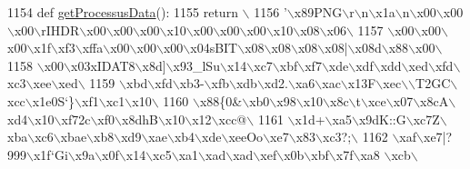 \begin{DoxyCode}
1154 \textcolor{keyword}{def }\hyperlink{namespaceimages_add9d06810f66b7f5621d259a3a02df09}{getProcessusData}():
1155     \textcolor{keywordflow}{return} \(\backslash\)
1156 \textcolor{stringliteral}{'\(\backslash\)x89PNG\(\backslash\)r\(\backslash\)n\(\backslash\)x1a\(\backslash\)n\(\backslash\)x00\(\backslash\)x00\(\backslash\)x00\(\backslash\)rIHDR\(\backslash\)x00\(\backslash\)x00\(\backslash\)x00\(\backslash\)x10\(\backslash\)x00\(\backslash\)x00\(\backslash\)x00\(\backslash\)x10\(\backslash\)x08\(\backslash\)x06\(\backslash\)}
1157 \textcolor{stringliteral}{\(\backslash\)x00\(\backslash\)x00\(\backslash\)x00\(\backslash\)x1f\(\backslash\)xf3\(\backslash\)xffa\(\backslash\)x00\(\backslash\)x00\(\backslash\)x00\(\backslash\)x04sBIT\(\backslash\)x08\(\backslash\)x08\(\backslash\)x08\(\backslash\)x08|\(\backslash\)x08d\(\backslash\)x88\(\backslash\)x00\(\backslash\)}
1158 \textcolor{stringliteral}{\(\backslash\)x00\(\backslash\)x03xIDAT8\(\backslash\)x8d]\(\backslash\)x93\_lSu\(\backslash\)x14\(\backslash\)xc7\(\backslash\)xbf\(\backslash\)xf7\(\backslash\)xde\(\backslash\)xdf\(\backslash\)xdd\(\backslash\)xed\(\backslash\)xfd\(\backslash\)xc3\(\backslash\)xee\(\backslash\)xed\(\backslash\)}
1159 \textcolor{stringliteral}{\(\backslash\)xbd\(\backslash\)xfd\(\backslash\)xb3-\(\backslash\)xfb\(\backslash\)xdb\(\backslash\)xd2.\(\backslash\)xa6\(\backslash\)xac\(\backslash\)x13F\(\backslash\)xec\(\backslash\)\(\backslash\)T2GC\(\backslash\)xcc\(\backslash\)x1e0S`\}\(\backslash\)xf1\(\backslash\)xc1\(\backslash\)x10\(\backslash\)}
1160 \textcolor{stringliteral}{\(\backslash\)x88\{0&\(\backslash\)xb0\(\backslash\)x98\(\backslash\)x10\(\backslash\)x8c\(\backslash\)t\(\backslash\)xce\(\backslash\)x07\(\backslash\)x8cA\(\backslash\)xd4\(\backslash\)x10\(\backslash\)xf72c\(\backslash\)xf0\(\backslash\)x8dhB\(\backslash\)x10\(\backslash\)x12\(\backslash\)xcc@\(\backslash\)}
1161 \textcolor{stringliteral}{\(\backslash\)x1d+\(\backslash\)xa5\(\backslash\)x9dK::G\(\backslash\)xc7Z\(\backslash\)xba\(\backslash\)xc6\(\backslash\)xbae\(\backslash\)xb8\(\backslash\)xd9\(\backslash\)xae\(\backslash\)xb4\(\backslash\)xde\(\backslash\)xeeOo\(\backslash\)xe7\(\backslash\)x83\(\backslash\)xc3?;\(\backslash\)}
1162 \textcolor{stringliteral}{\(\backslash\)xaf\(\backslash\)xe7|?999\(\backslash\)x1f`Gi\(\backslash\)x9a\(\backslash\)x0f\(\backslash\)x14\(\backslash\)xc5\(\backslash\)xa1\(\backslash\)xad\(\backslash\)xad\(\backslash\)xef\(\backslash\)x0b\(\backslash\)xbf\(\backslash\)x7f\(\backslash\)xa8 \(\backslash\)xcb\(\backslash\)}

\end{DoxyCode}
